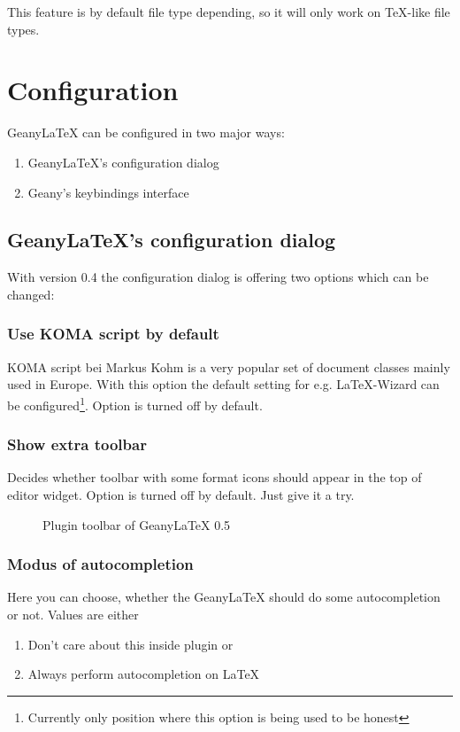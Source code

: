 \documentclass[%
a4paper,%
10pt,%
oneside,%
DIV18,
headsepline,
plainheadsepline,
footsepline,
plainfootsepline,
bibtotoc,%
liststotoc,%
BCOR12mm,%
halfparskip,%
openany,%
]{scrartcl}
\begin{document}
This feature is by default file type depending, so it will only work
on \TeX{}-like file types.


\section{Configuration}

GeanyLaTeX{} can be configured in two major ways:
\begin{enumerate}
\item GeanyLaTeX{}'s configuration dialog
\item Geany's keybindings interface
\end{enumerate}

\subsection{GeanyLaTeX{}'s configuration dialog}
With version 0.4 the configuration dialog is offering two options which
can be changed:

\subsubsection{Use KOMA script by default}
KOMA script bei Markus Kohm is a very popular set of document classes
mainly used in Europe. With this option the default setting for e.g.
\LaTeX{}-Wizard can be configured\footnote{Currently only position where
this option is being used to be honest}. Option is turned off by default.

\subsubsection{Show extra toolbar}
Decides whether toolbar with some format icons should appear in the top
of editor widget. Option is turned off by default. Just give it a try.

\begin{figure}[h!]
	\caption{Plugin toolbar of Geany\LaTeX{} 0.5}
\end{figure}

\subsubsection{Modus of autocompletion}
\label{sec:modus_of_autocompletion}
Here you can choose, whether the Geany\LaTeX{} should do some
autocompletion or not. Values are either
\begin{enumerate}
	\item Don't care about this inside plugin or
	\item Always perform autocompletion on LaTeX
\end{enumerate}
\end{document}
